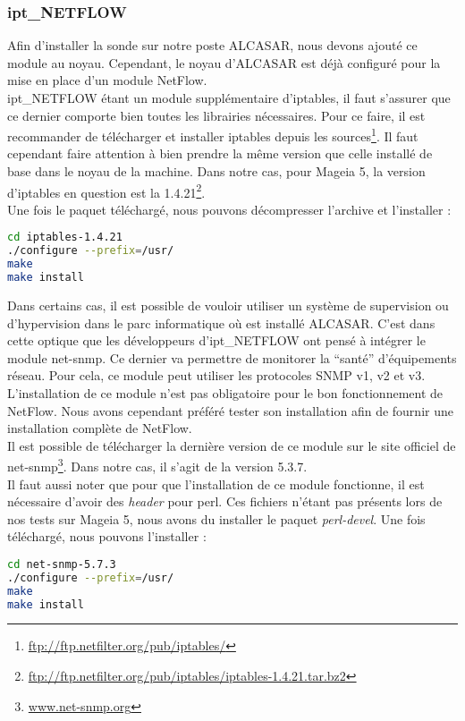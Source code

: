 \subsubsection{ipt\_NETFLOW}
Afin d'installer la sonde sur notre poste ALCASAR, nous devons ajouté ce module au noyau. Cependant, le noyau d'ALCASAR est déjà configuré pour la mise en place d'un module NetFlow.\\
ipt\_NETFLOW étant un module supplémentaire d'iptables, il faut s'assurer que ce dernier comporte bien toutes les librairies nécessaires. Pour ce faire, il est recommander de télécharger et installer iptables depuis les sources\footnote{\url{ftp://ftp.netfilter.org/pub/iptables/}}. Il faut cependant faire attention à bien prendre la même version que celle installé de base dans le noyau de la machine. Dans notre cas, pour Mageia 5, la version d'iptables en question est la 1.4.21\footnote{\url{ftp://ftp.netfilter.org/pub/iptables/iptables-1.4.21.tar.bz2}}.\\
Une fois le paquet téléchargé, nous pouvons décompresser l'archive et l'installer :
\begin{lstlisting}[style=custombash, language=bash]
cd iptables-1.4.21
./configure --prefix=/usr/
make
make install 
\end{lstlisting}
Dans certains cas, il est possible de vouloir utiliser un système de supervision ou d'hypervision dans le parc informatique où est installé ALCASAR. C'est dans cette optique que les développeurs d'ipt\_NETFLOW ont pensé à intégrer le module net-snmp. Ce dernier va permettre de monitorer la \enquote{santé} d'équipements réseau. Pour cela, ce module peut utiliser les protocoles SNMP v1, v2 et v3.\\
L'installation de ce module n'est pas obligatoire pour le bon fonctionnement de NetFlow. Nous avons cependant préféré tester son installation afin de fournir une installation complète de NetFlow.\\
Il est possible de télécharger la dernière version de ce module sur le site officiel de net-snmp\footnote{\url{www.net-snmp.org}}. Dans notre cas, il s'agit de la version 5.3.7.\\
Il faut aussi noter que pour que l'installation de ce module fonctionne, il est nécessaire d'avoir des \textit{header} pour perl. Ces fichiers n'étant pas présents lors de nos tests sur Mageia 5, nous avons du installer le paquet \textit{perl-devel}.
\newpage
Une fois téléchargé, nous pouvons l'installer :
\begin{lstlisting}[language=bash,style=custombash]
cd net-snmp-5.7.3
./configure --prefix=/usr/
make
make install
\end{lstlisting}
